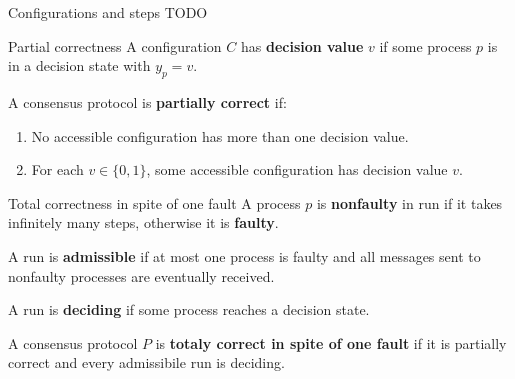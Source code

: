 \documentclass[12pt]{beamer}
\begin{document}
  \begin{frame}{Configurations and steps}
    TODO
  \end{frame}

  \begin{frame}{Partial correctness}
    A configuration \(C\) has \textbf{decision value} \(v\) if some process \(p\) is in a decision state with \(y_p = v\).

    \vspace{0.25cm}

    \begin{definition}
      A consensus protocol is \textbf{partially correct} if:
      \begin{enumerate}
        \item No accessible configuration has more than one decision value.
        \item For each \(v\in \{0,1\}\), some accessible configuration has decision value \(v\).
      \end{enumerate}
    \end{definition}
  \end{frame}

  \begin{frame}{Total correctness in spite of one fault}
    A process \(p\) is \textbf{nonfaulty} in run if it takes infinitely many steps, otherwise it is \textbf{faulty}.

    \vspace{0.25cm}

    A run is \textbf{admissible} if at most one process is faulty and all messages sent to nonfaulty processes are eventually received.

    \vspace{0.25cm}

    A run is \textbf{deciding} if some process reaches a decision state.

    \vspace{0.25cm}

    \begin{definition}
      A consensus protocol \(P\) is \textbf{totaly correct in spite of one fault} if it is partially correct and every admissibile run is deciding.
    \end{definition}
  \end{frame}
\end{document}
